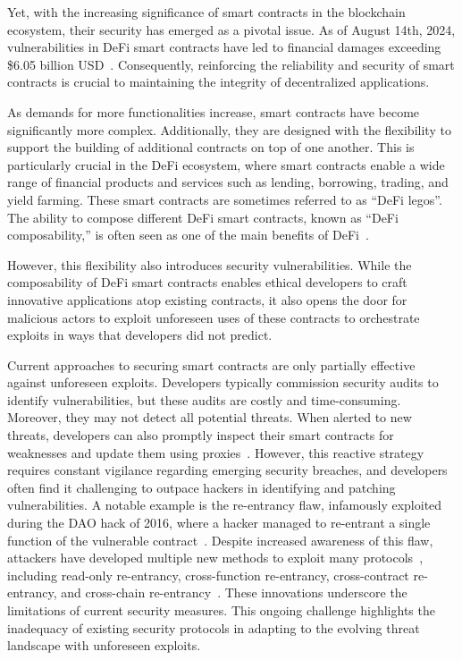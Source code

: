 Yet, with the increasing significance of smart contracts in the blockchain
ecosystem, their security has emerged as a pivotal issue. As of August 14th,
2024, vulnerabilities in DeFi smart contracts have led to financial damages
exceeding \$6.05 billion USD~\cite{defillamahacks}. Consequently, reinforcing
the reliability and security of smart contracts is crucial to maintaining the
integrity of decentralized applications.

As demands for more functionalities increase, smart contracts have become
significantly more complex. Additionally, they are designed with the
flexibility to support the building of additional contracts on top of one
another. This is particularly crucial in the DeFi ecosystem, where smart
contracts enable a wide range of financial products and services such as
lending, borrowing, trading, and yield farming. These smart contracts are
sometimes referred to as ``DeFi legos''. The ability to compose different DeFi
smart contracts, known as ``DeFi composability,'' is often seen as one of the
main benefits of DeFi~\cite{popescu2020decentralized, amler2021defi,
schar2021decentralized}.

However, this flexibility also introduces security vulnerabilities. While the
composability of DeFi smart contracts enables ethical developers to craft
innovative applications atop existing contracts, it also opens the door for
malicious actors to exploit unforeseen uses of these contracts to orchestrate
exploits in ways that developers did not predict. 

Current approaches to securing smart contracts are only partially effective
against unforeseen exploits. Developers typically commission security audits to
identify vulnerabilities, but these audits are costly and time-consuming.
Moreover, they may not detect all potential threats. When alerted to new
threats, developers can also promptly inspect their smart contracts for
weaknesses and update them using proxies~\cite{bodell2023proxy}. However, this
reactive strategy requires constant vigilance regarding emerging security
breaches, and developers often find it challenging to outpace hackers in
identifying and patching vulnerabilities. A notable example is the re-entrancy
flaw, infamously exploited during the DAO hack of 2016, where a hacker managed
to re-entrant a single function of the vulnerable
contract~\cite{liu2018reguard, coindesk_dao_hack}. Despite increased awareness
of this flaw, attackers have developed multiple new methods to exploit many
protocols~\cite{caversaccio_reentrancy_attacks}, including read-only
re-entrancy, cross-function re-entrancy, cross-contract re-entrancy, and
cross-chain re-entrancy~\cite{callens2024temporarily,
valixconsulting_cross_function_reentrancy_2023, wang2024efficiently,
valixconsulting_cross_contract_reentrancy_2023, cross_chain_reentrancy}. These
innovations underscore the limitations of current security measures. This
ongoing challenge highlights the inadequacy of existing security protocols in
adapting to the evolving threat landscape with unforeseen exploits.
\fi

